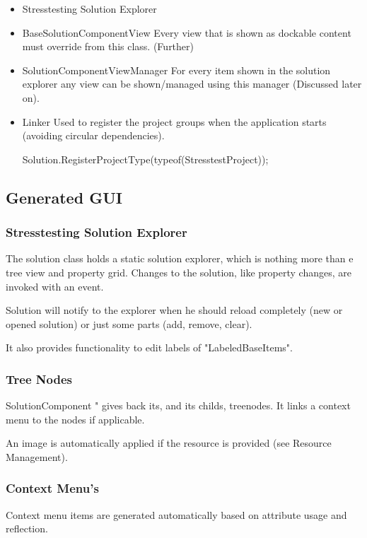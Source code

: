 \begin{itemize}
\begin{itemize}
\begin{codelisting}
\end{codelisting}
\item ...
\end{itemize}
\npar
and is approachable like a collection (of "BaseItem"-s).
\item Stresstesting Solution Explorer
\item BaseSolutionComponentView
\npar
Every view that is shown as dockable content must override from this class. (Further)
\item SolutionComponentViewManager
\npar
For every item shown in the solution explorer any view can be shown/managed using this manager (Discussed later on).
\item Linker
\npar
Used to register the project groups when the application starts (avoiding circular dependencies).
\npar
\begin{codelisting}
Solution.RegisterProjectType(typeof(StresstestProject));
\end{codelisting}
\end{itemize}

\subsection{Generated GUI}
\subsubsection{Stresstesting Solution Explorer}
The solution class holds a static solution explorer, which is nothing more than e tree view and property grid. Changes to the solution, like property changes, are invoked with an event.

Solution will notify to the explorer when he should reload completely (new or opened solution) or just some parts (add, remove, clear).

It also provides functionality to edit labels of "LabeledBaseItems".
\subsubsection{Tree Nodes}
SolutionComponent " gives back its, and its childs, treenodes. It links a context menu to the nodes if applicable.
\begin{codelisting}
public TreeNode GetTreeNode(){...
\end{codelisting}
An image is automatically applied if the resource is provided (see Resource Management).
\subsubsection{Context Menu's}
Context menu items are generated automatically based on attribute usage and reflection.

